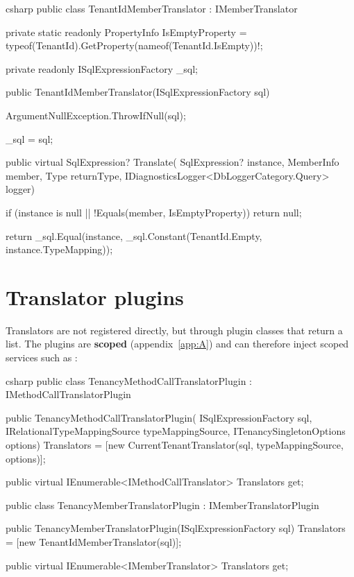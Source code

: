 \begin{sourcecode}{csharp}
public class TenantIdMemberTranslator : IMemberTranslator
{
    private static readonly PropertyInfo IsEmptyProperty =
        typeof(TenantId).GetProperty(nameof(TenantId.IsEmpty))!;

    private readonly ISqlExpressionFactory _sql;

    public TenantIdMemberTranslator(ISqlExpressionFactory sql)
    {
        ArgumentNullException.ThrowIfNull(sql);

        _sql = sql;
    }

    public virtual SqlExpression? Translate(
        SqlExpression? instance, MemberInfo member, Type returnType,
        IDiagnosticsLogger<DbLoggerCategory.Query> logger)
    {
        if (instance is null || !Equals(member, IsEmptyProperty))
            return null;

        return _sql.Equal(instance, _sql.Constant(TenantId.Empty, instance.TypeMapping));
    }
}
\end{sourcecode}

\section{Translator plugins}

Translators are not registered directly, but through plugin classes that return a list. The
plugins are \textbf{scoped} (appendix~\ref{app:A}) and can therefore inject scoped services
such as :

\begin{sourcecode}{csharp}
public class TenancyMethodCallTranslatorPlugin : IMethodCallTranslatorPlugin
{
    public TenancyMethodCallTranslatorPlugin(
        ISqlExpressionFactory sql,
        IRelationalTypeMappingSource typeMappingSource,
        ITenancySingletonOptions options)
    {
        Translators = [new CurrentTenantTranslator(sql, typeMappingSource, options)];
    }

    public virtual IEnumerable<IMethodCallTranslator> Translators { get; }
}

public class TenancyMemberTranslatorPlugin : IMemberTranslatorPlugin
{
    public TenancyMemberTranslatorPlugin(ISqlExpressionFactory sql)
    {
        Translators = [new TenantIdMemberTranslator(sql)];
    }

    public virtual IEnumerable<IMemberTranslator> Translators { get; }
}
\end{sourcecode}

